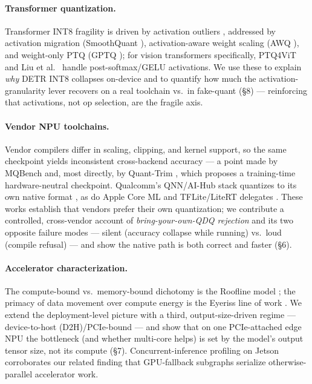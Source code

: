 \documentclass[11pt]{article}
\begin{document}
\paragraph{Transformer quantization.}
Transformer INT8 fragility is driven by activation outliers \citep{dettmers2022llmint8, bondarenko2021}, addressed by activation migration (SmoothQuant \citep{xiao2022smoothquant}), activation-aware weight scaling (AWQ \citep{lin2023awq}), and weight-only PTQ (GPTQ \citep{frantar2022gptq}); for vision transformers specifically, PTQ4ViT \citep{yuan2022ptq4vit} and Liu et al.\ \citep{liu2021ptqvit} handle post-softmax/GELU activations. We use these to explain \emph{why} DETR INT8 collapses on-device and to quantify how much the activation-granularity lever recovers on a real toolchain vs.\ in fake-quant (\S8) --- reinforcing that activations, not op selection, are the fragile axis.

\paragraph{Vendor NPU toolchains.}
Vendor compilers differ in scaling, clipping, and kernel support, so the same checkpoint yields inconsistent cross-backend accuracy --- a point made by MQBench \citep{li2021mqbench} and, most directly, by Quant-Trim \citep{dhahri2025quanttrim}, which proposes a training-time hardware-neutral checkpoint. Qualcomm's QNN/AI-Hub stack quantizes to its own native format \citep{qualcomm_qnn}, as do Apple Core ML \citep{coreml} and TFLite/LiteRT delegates \citep{litert}. These works establish that vendors prefer their own quantization; we contribute a controlled, cross-vendor account of \emph{bring-your-own-QDQ rejection} and its two opposite failure modes --- silent (accuracy collapse while running) vs.\ loud (compile refusal) --- and show the native path is both correct and faster (\S6).

\paragraph{Accelerator characterization.}
The compute-bound vs.\ memory-bound dichotomy is the Roofline model \citep{williams2009roofline}; the primacy of data movement over compute energy is the Eyeriss line of work \citep{chen2016eyeriss, sze2017efficient}. We extend the deployment-level picture with a third, output-size-driven regime --- device-to-host (D2H)/PCIe-bound --- and show that on one PCIe-attached edge NPU the bottleneck (and whether multi-core helps) is set by the model's output tensor size, not its compute (\S7). Concurrent-inference profiling on Jetson \citep{jetsonconcurrent2025} corroborates our related finding that GPU-fallback subgraphs serialize otherwise-parallel accelerator work.
\end{document}
